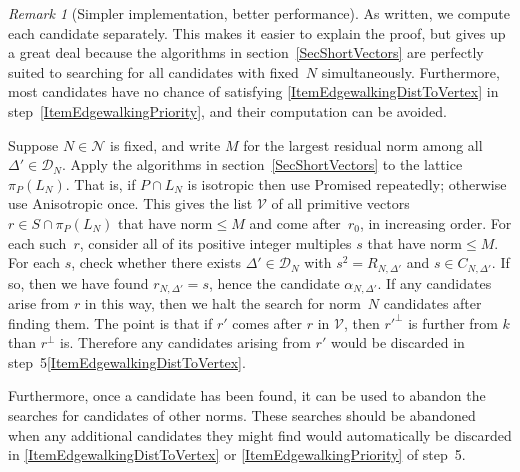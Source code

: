 \documentclass[12pt]{amsart}
\def\calV{\mathcal{V}}
\def\calD{\mathcal{D}}
\def\calN{\mathcal{N}}
\def\D{\Delta}
\numberwithin{theorem}{section}
\numberwithin{equation}{section}
\numberwithin{figure}{section}
\theoremstyle{remark}
\newtheorem{remark}[theorem]{Remark}
\begin{document}
\begin{remark}[Simpler implementation, better performance]
    As written, we compute each candidate separately.  
    This makes it easier to explain the proof, but
    gives up a great deal because
    the algorithms in section~\ref{SecShortVectors} are perfectly suited to
    searching for all candidates with fixed~$N$ simultaneously.
    Furthermore, most candidates have no chance of satisfying
    \eqref{ItemEdgewalkingDistToVertex} in step~\ref{ItemEdgewalkingPriority}, and their computation 
    can be avoided.   

    Suppose $N\in\calN$ is fixed, and write $M$ for the largest
    residual norm among all $\D'\in\calD_N$.  
    Apply the algorithms in section~\ref{SecShortVectors} to the lattice
    $\pi_P(L_N)$.  That is, if $P\cap L_N$ is isotropic then use
    {\sf Promised} repeatedly; otherwise use {\sf Anisotropic} once.
    This gives the list $\calV$ of all primitive 
     vectors $r\in S\cap\pi_P(L_N)$ that have norm${}\leq M$  and
     come after~$r_0$, in increasing
    order.  For each such~$r$, consider all of its positive integer
    multiples $s$ that have norm${}\leq M$.  For each $s$,
    check whether there exists $\D'\in\calD_N$
    with $s^2=R_{N,\D'}$ and $s\in C_{N,\D'}$.  If so,
    then we have found $r_{N,\D'}=s$, hence the candidate
    $\alpha_{N,\D'}$.  If any candidates arise from $r$ in
    this way, then we halt the
    search for norm~$N$ candidates after finding them.
    The point is that if $r'$ comes after $r$ in $\calV$,
    then $r'^\perp$ is further from $k$ than $r^\perp$ is.
    Therefore any candidates arising from $r'$ would be discarded
    in step~5\eqref{ItemEdgewalkingDistToVertex}.%

    Furthermore, once a candidate has been found, it can be
    used to abandon the searches for candidates of other norms.
    These searches should be abandoned when
    any additional candidates they might find would automatically be
    discarded in \eqref{ItemEdgewalkingDistToVertex} or \eqref{ItemEdgewalkingPriority} of step~5.%
\end{remark}
\end{document}
